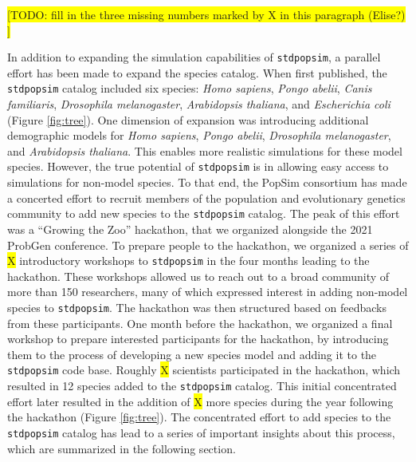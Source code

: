 \documentclass{article}
\newcommand{\stdpopsim}{\texttt{stdpopsim}\xspace}
\begin{document}
\colorbox{yellow}{[TODO: fill in the three missing numbers marked by X in this paragraph (Elise?) ]}

In addition to expanding the simulation capabilities of \texttt{\stdpopsim}, a parallel effort has been made to expand the species catalog. When first
published, the \texttt{\stdpopsim} catalog included six species: \emph{Homo sapiens}, \emph{Pongo abelii}, \emph{Canis familiaris}, \emph{Drosophila melanogaster}, \emph{Arabidopsis thaliana}, and \emph{Escherichia coli} (Figure \ref{fig:tree}).
One dimension of expansion was introducing additional demographic models for \emph{Homo sapiens}, \emph{Pongo abelii}, \emph{Drosophila melanogaster}, and \emph{Arabidopsis thaliana}. This enables more realistic simulations for these model species. 
However, the true potential of \texttt{\stdpopsim} is in allowing easy access to simulations for non-model species. To that end, the PopSim consortium has made a concerted effort to recruit members of the population and evolutionary genetics community to add new species to the \stdpopsim catalog. The peak of this effort was a ``Growing the Zoo'' hackathon, that we organized alongside the 2021 ProbGen conference. To prepare people to the hackathon, we organized a series of \colorbox{yellow}{X} introductory workshops to \texttt{\stdpopsim} in the four months leading to the hackathon. These workshops allowed us to reach out to a broad community of more than 150 researchers, many of which expressed interest in adding non-model species to \texttt{\stdpopsim}. The hackathon was then structured based on feedbacks from these participants. One month before the hackathon, we organized a final workshop to prepare interested participants for the hackathon, by introducing them to  the process of developing a new species model and adding it to the \texttt{\stdpopsim}
code base. 
Roughly \colorbox{yellow}{X} scientists participated in the hackathon, which resulted in 12 species added to the \texttt{\stdpopsim} catalog.
This initial concentrated effort later resulted in the addition of \colorbox{yellow}{X} more species during the year following the hackathon (Figure \ref{fig:tree}).
The concentrated effort to add species to the \texttt{\stdpopsim} catalog has lead to a series of important insights about this process, which are summarized in the following section.
\end{document}
